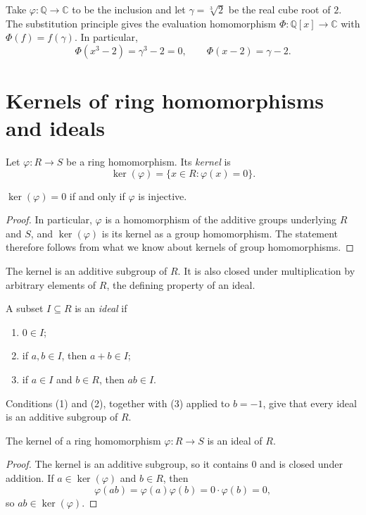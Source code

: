 \documentclass[reqno,11pt]{amsart}
\newcommand{\Q}{\mathbb{Q}}
\newcommand{\C}{\mathbb{C}}
\begin{document}
\begin{example}\label{ex:cube-root-evaluation}
Take $\varphi:\Q\to\C$ to be the inclusion and let
$\gamma=\sqrt[3]{2}$ be the real cube root of $2$. The substitution
principle gives the evaluation homomorphism $\Phi:\Q[x]\to\C$ with
$\Phi(f)=f(\gamma)$. In particular,
\[
  \Phi(x^3-2)=\gamma^3-2=0,\qquad \Phi(x-2)=\gamma-2.
\]
\end{example}

\section{Kernels of ring homomorphisms and ideals}

\begin{define}[Kernel]
Let $\varphi:R\to S$ be a ring homomorphism. Its \emph{kernel} is
\[
  \ker(\varphi)=\{x\in R:\varphi(x)=0\}.
\]
\end{define}

\begin{proposition}\label{prop:injective}
$\ker(\varphi)=0$ if and only if $\varphi$ is injective.
\end{proposition}
\begin{proof}
In particular, $\varphi$ is a homomorphism of the additive groups
underlying $R$ and $S$, and $\ker(\varphi)$ is its kernel as a group
homomorphism. The statement therefore follows from what we know about
kernels of group homomorphisms.
\end{proof}

The kernel is an additive subgroup of $R$. It is also closed under
multiplication by arbitrary elements of $R$, the defining property
of an ideal.

\begin{define}[Ideal]
A subset $I\subseteq R$ is an \emph{ideal} if
\begin{enumerate}[label=(\arabic*)]
  \item $0\in I$;
  \item if $a,b\in I$, then $a+b\in I$;
  \item if $a\in I$ and $b\in R$, then $ab\in I$.
\end{enumerate}
\end{define}

Conditions (1) and (2), together with (3) applied to $b=-1$, give
that every ideal is an additive subgroup of $R$.

\begin{lemma}
The kernel of a ring homomorphism $\varphi:R\to S$ is an ideal of $R$.
\end{lemma}
\begin{proof}
The kernel is an additive subgroup, so it contains $0$ and is
closed under addition. If $a\in\ker(\varphi)$ and $b\in R$, then
\[
  \varphi(ab)=\varphi(a)\varphi(b)=0\cdot\varphi(b)=0,
\]
so $ab\in\ker(\varphi)$.
\end{proof}
\end{document}

